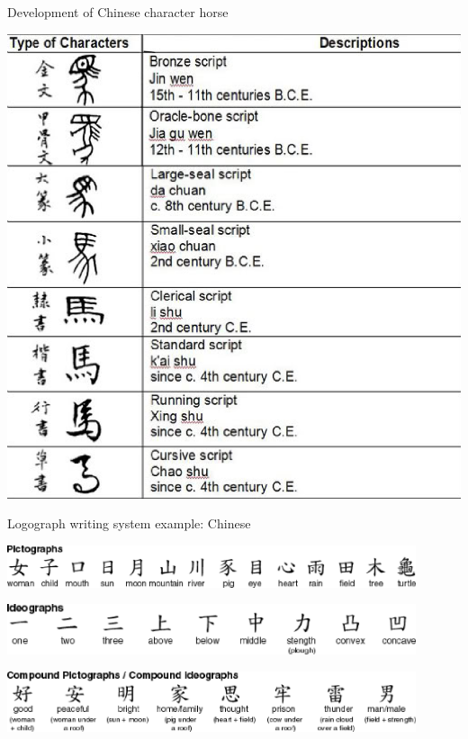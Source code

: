 \documentclass[xetex]{beamer}
\begin{document}
\begin{frame}{Development of Chinese character horse }

  \begin{center}
  \includegraphics[height=0.85\textheight]{pics/horse-hanzi.eps}    
  \end{center}


\end{frame}

\begin{frame}{Logograph writing system example: Chinese}


  \includegraphics[width=0.9\textwidth]{pics/hanzi-1.eps}
\bigskip

\includegraphics[width=0.9\textwidth]{pics/hanzi-2.eps}
\bigskip

\includegraphics[width=0.9\textwidth]{pics/hanzi-3.eps}


\end{frame}
\end{document}
